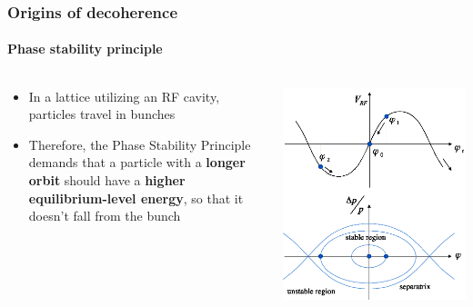 \documentclass{beamer}
\begin{document}
\begin{frame}\frametitle{Origins of decoherence} \framesubtitle{Phase stability principle}
  \begin{columns}
    \begin{column}{.5\textwidth}
      \begin{itemize}
      \item In a lattice utilizing an RF cavity, particles travel in bunches
      \item Therefore, the Phase Stability Principle demands that a particle with a \textbf{longer orbit} should have a \textbf{higher equilibrium-level energy}, so that it doesn't fall from the bunch
      \end{itemize}
    \end{column}
    \begin{column}{.5\textwidth}
      \centering
      \includegraphics[width=\linewidth]{psp_diagram}
    \end{column}
  \end{columns}
\end{frame}
\end{document}
